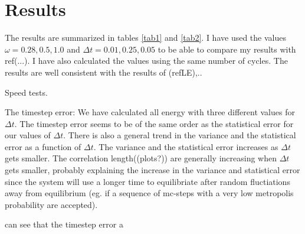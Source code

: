 \documentclass[a4paper,10pt,twocolumn]{article} %
\newcommand{\expec}[1]{\langle{}{#1}\rangle{}}
\begin{document}
\section{Results} %

The results are summarized in tables \ref{tab1} and \ref{tab2}. I have used the values $\omega=0.28,0.5,1.0$ and $\Delta t = 0.01,0.25,0.05$ to be able to compare my 
results with ref(...). I have also calculated the values using the same number of cycles. The results are well consistent with the results of (refLE),..

Speed tests.


The timestep error: We have calculated all energy with three different values for $\Delta t$. 
The timestep error seems to be of the same order as the statistical error for our values of $\Delta t$. 
There is also a general trend in the variance and the statistical error as a function of $\Delta t$. The variance and the statistical error increases as $\Delta t$ gets smaller.
The correlation length((plots?)) are generally increasing when $\Delta t$ gets smaller, probably explaining the increase in the variance and statistical error since the system will use a longer
time to equilibriate after random fluctiations away from equilibrium (eg. if a sequence of mc-steps with a very low metropolis probability are accepted).
%





 can see that the timestep error   a 
\end{document}

